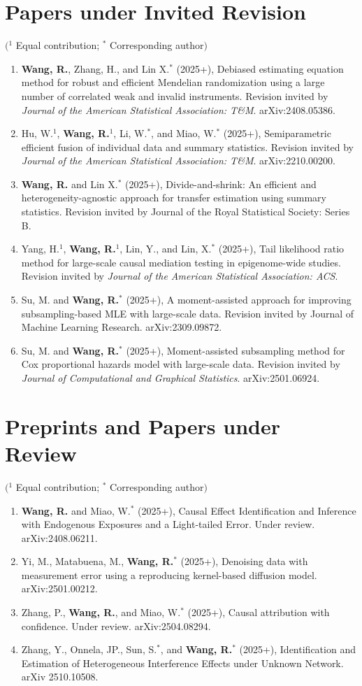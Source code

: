 \documentclass[letterpaper,12pt]{article}
\newcommand{\shorterSection}[1]{\vspace{-10pt}\section{#1}}
\begin{document}
    \shorterSection{Papers under Invited Revision}
    $\big($$^1$ Equal contribution; $^*$ Corresponding author$\big)$
    \begin{enumerate}[leftmargin=*]
       \item
       {
       	\textbf{Wang, R.}, Zhang, H., and Lin X.$^*$ (2025+), Debiased estimating equation method for robust and efficient Mendelian randomization using a large number of correlated weak and invalid instruments. Revision invited by \emph{Journal of the American Statistical Association: T\&M}. arXiv:2408.05386.
       } 
       \item{Hu, W.$^1$, \textbf{Wang, R.}$^1$, Li, W.$^*$, and Miao, W.$^*$ (2025+), Semiparametric efficient fusion of individual data and summary statistics. Revision invited by \emph{Journal of the American Statistical Association: T\&M}. arXiv:2210.00200.}
       \item
       {
       	\textbf{Wang, R.} and Lin X.$^*$ (2025+), Divide-and-shrink: An efficient and heterogeneity-agnostic approach for transfer estimation using summary statistics. Revision invited by Journal of the Royal Statistical Society: Series B.
       } 
       \item{Yang, H.$^1$, \textbf{Wang, R.}$^1$, Lin, Y., and Lin, X.$^*$ (2025+), Tail likelihood ratio method for large-scale causal mediation testing in epigenome-wide studies. Revision invited by \emph{Journal of the American Statistical Association: ACS}.}
       \item{
       	Su, M. and \textbf{Wang, R.}$^*$ (2025+), A moment-assisted approach for improving subsampling-based MLE with large-scale data. Revision invited by Journal of Machine Learning Research. arXiv:2309.09872.
       }  
       \item{
       	Su, M. and \textbf{Wang, R.}$^*$ (2025+), Moment-assisted subsampling method for Cox proportional hazards model with large-scale data. Revision invited by \emph{Journal of Computational and Graphical Statistics}. arXiv:2501.06924.
       }  
    \end{enumerate}
    
     \shorterSection{Preprints and Papers under Review}
     $\big($$^1$ Equal contribution; $^*$ Corresponding author$\big)$
    \begin{enumerate}[leftmargin=*]
    \item
    {
    	\textbf{Wang, R.} and Miao, W.$^*$ (2025+), Causal Effect Identification and Inference with Endogenous Exposures and a Light-tailed Error. Under review. arXiv:2408.06211.
    } 
    \item{
    	Yi, M., Matabuena, M., \textbf{Wang, R.}$^*$ (2025+), Denoising data with measurement error using a reproducing kernel-based diffusion model. arXiv:2501.00212.
    }  
    \item{
    	Zhang, P., \textbf{Wang, R.}, and Miao, W.$^*$ (2025+), Causal attribution with confidence. Under review. arXiv:2504.08294.
    } 
    \item{
    Zhang, Y., Onnela, JP., Sun, S.$^*$, and \textbf{Wang, R.}$^*$ (2025+), Identification and Estimation of Heterogeneous Interference Effects under Unknown Network. arXiv 2510.10508.
    }
    \end{enumerate}
     
\end{document}
